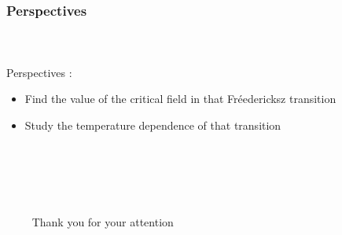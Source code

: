 \documentclass{beamer}
\begin{document}
\begin{frame}
	\frametitle{Perspectives}
	\framesubtitle{\ }
    Perspectives :
    \begin{itemize}
        \item Find the value of the critical field in that Fréedericksz transition 
        \item Study the temperature dependence of that transition
    \end{itemize}

\end{frame}

\begin{frame}
	\frametitle{\ }
	\framesubtitle{\ }

{\center $\qquad$ \Huge Thank you for your attention}

\end{frame}




\end{document}
